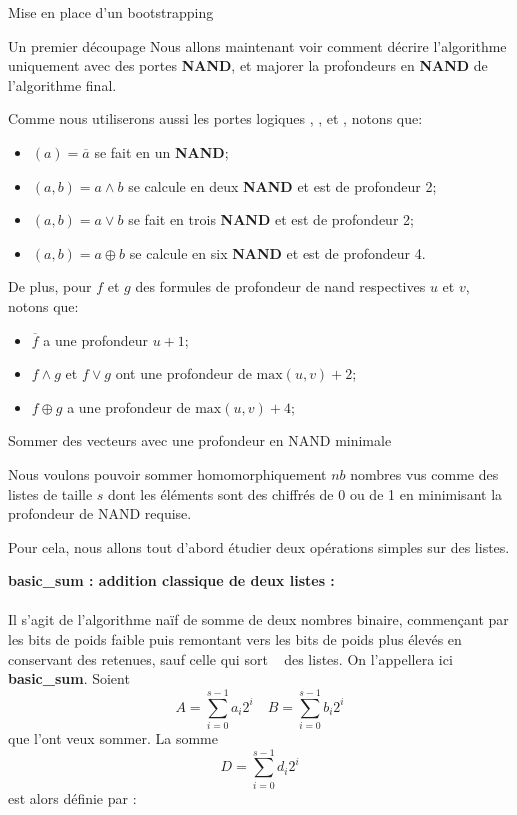 \begin{section}{Mise en place d'un bootstrapping}
\begin{subsection}{Un premier découpage}
	Nous allons maintenant voir comment décrire l'algorithme uniquement avec des portes \textbf{NAND}, et majorer la profondeurs en \textbf{NAND} de l'algorithme final.

	Comme nous utiliserons aussi les portes logiques , ,  et , notons que:
\begin{itemize}
\item {}$(a) = \overline{a}$ se fait en un \textbf{NAND};
\item {}$(a, b) = a \land b$ se calcule en deux \textbf{NAND} et est de
	profondeur 2;
\item {}$(a, b) = a \lor b$ se fait en trois \textbf{NAND} et est de
	profondeur 2;
\item {}$(a, b) = a \oplus b$ se calcule en six \textbf{NAND} et est de
	profondeur 4.
\end{itemize}
De plus, pour $f$ et $g$ des formules de profondeur de nand respectives $u$ et
$v$, notons que:
\begin{itemize}
\item $\overline{f}$ a une profondeur $u+1$;
\item $f \land g$ et $f \lor g$ ont une profondeur de $\text{max}(u,v) + 2$;
\item $f \oplus g$ a une profondeur de $\text{max}(u,v) + 4$;
\end{itemize}
\end{subsection}
\begin{subsection}{Sommer des vecteurs avec une profondeur en NAND minimale}

	Nous voulons pouvoir sommer homomorphiquement $nb$ nombres vus comme des listes de taille $s$ dont les éléments sont des chiffrés de 0 ou de 1 en minimisant la profondeur de NAND requise. 

	Pour cela, nous allons tout d'abord étudier deux opérations simples sur des listes.

\vspace{0.3cm}
\noindent
\textbf{basic\_sum : addition classique de deux listes :}
\paragraph{}
	Il s'agit de l'algorithme naïf de somme de deux nombres binaire, commençant par les bits de poids faible puis remontant vers les bits de poids plus élevés en conservant des retenues, sauf celle qui \og sort \fg~ des listes. On l'appellera ici \textbf{basic\_sum}. Soient 
\[ A = \sum_{i=0}^{s-1} a_i 2^i \quad B = \sum_{i=0}^{s-1} b_i 2^i\]
que l'ont veux sommer. La somme
\[D =\sum_{i=0}^{s-1} d_i 2^i\]
est alors définie par :
	

\end{subsection}
\end{section}
